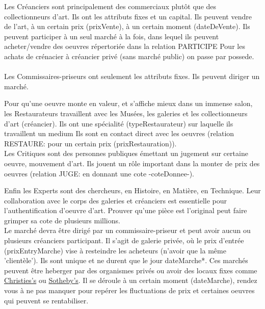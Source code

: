 \documentclass{article}
\begin{document}
    
\begin{multicols}{2}[]
Les Créanciers sont principalement des commerciaux plutôt que des collectionneurs d'art. 
Ils ont les attributs fixes et un capital.
Ils peuvent vendre de l'art, à un certain prix (prixVente), à un certain moment (dateDeVente).
Ils peuvent participer à un seul marché à la fois, dans lequel ils peuvent acheter/vendre des oeuvres répertoriée dans la relation PARTICIPE
Pour les achats de crénacier à créancier privé (sans marché public) on passe par possede.
\\ \\

Les Commissaires-priseurs ont seulement les attributs fixes.
Ils peuvent diriger un marché.

Pour qu'une oeuvre monte en valeur, et s'affiche mieux dans un immense salon,
les Restaurateurs travaillent avec les Musées, les galeries et les collectionneurs d'art (créancier).
Ils ont une spécialité (typeRestaurateur) sur laquelle ils travaillent un medium
Ils sont en contact direct avec les oeuvres (relation RESTAURE: pour un certain prix (prixRestauration)).
\\

    Les Critiques sont des personnes publiques émettant un jugement sur certaine oeuvre, mouvement d'art.
Ils jouent un rôle important dans la monter de prix des oeuvres (relation JUGE: en donnant une cote -coteDonnee-).
\end{multicols}

\clearpage

Enfin les Experts sont des chercheurs, en Histoire, en Matière, en Technique.
Leur collaboration avec le corps des galeries et créanciers est essentielle pour l'authentification d'oeuvre d'art.
Prouver qu'une pièce est l'original peut faire grimper sa cote de plusieurs millions. \cite{Christ's_Portrait}
\\

Le marché devra être dirigé par un commissaire-priseur et peut avoir aucun ou plusieurs créanciers participant.
Il s'agit de galerie privée, où le prix d'entrée (prixEntryMarche) vise à resteindre les acheteurs (n'avoir que la même 'clientèle').
Ils sont unique et ne durent que le jour dateMarche*.
Ces marchés peuvent être heberger par des organismes privés ou avoir des locaux fixes comme \href{https://fr.wikipedia.org/wiki/Christie's}{Christies's} ou \href{https://fr.wikipedia.org/wiki/Sotheby's}{Sotheby's}.
Il se déroule à un certain moment (dateMarche), rendez vous à ne pas manquer pour repérer les fluctuations de prix et certaines oeuvres qui peuvent se rentabiliser.
\\
\end{document}
